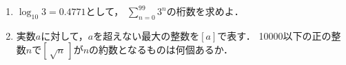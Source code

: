 \documentclass[../../main.tex]{subfiles}
\begin{document}
\begin{enumerate}
  \item $\log_{10}3=0.4771$として，
    $\displaystyle\sum_{n=0}^{99}3^n$の桁数を求めよ．
  \item 実数$a$に対して，$a$を超えない最大の整数を$[a]$で表す．
    10000以下の正の整数$n$で$[ \, \sqrt{n} \, ]$が$n$の約数となるものは何個あるか．
\end{enumerate}
\end{document}
